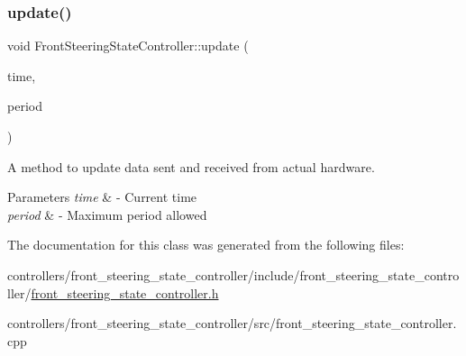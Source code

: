 \subsubsection{\texorpdfstring{update()}{update()}}
{\footnotesize\ttfamily void Front\+Steering\+State\+Controller\+::update (\begin{DoxyParamCaption}\item[{const ros\+::\+Time \&}]{time,  }\item[{const ros\+::\+Duration \&}]{period }\end{DoxyParamCaption})}



A method to update data sent and received from actual hardware. 


\begin{DoxyParams}{Parameters}
{\em time} & -\/ Current time \\
\hline
{\em period} & -\/ Maximum period allowed \\
\hline
\end{DoxyParams}


The documentation for this class was generated from the following files\+:\begin{DoxyCompactItemize}
\item 
controllers/front\+\_\+steering\+\_\+state\+\_\+controller/include/front\+\_\+steering\+\_\+state\+\_\+controller/\hyperlink{front__steering__state__controller_8h}{front\+\_\+steering\+\_\+state\+\_\+controller.\+h}\item 
controllers/front\+\_\+steering\+\_\+state\+\_\+controller/src/front\+\_\+steering\+\_\+state\+\_\+controller.\+cpp\end{DoxyCompactItemize}
